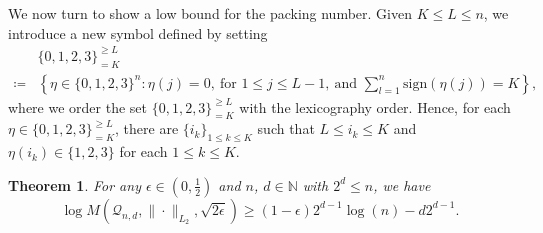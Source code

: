 \documentclass{amsbook}
\newtheorem{theorem}{Theorem}[chapter]
\theoremstyle{definition}
\theoremstyle{remark}
\numberwithin{section}{chapter}
\numberwithin{equation}{chapter}
\newcommand{\1}{\mathbf{1}}
\begin{document}
We now turn to show a low bound for the packing number. Given $K\leq L\leq n$, we introduce a new symbol defined by setting
\begin{align*}
&\{0,1,2,3\}^{\geq L}_{=K}\\
\coloneqq&\left\{\eta\in \{0,1,2,3\}^{n}:\eta(j)=0,~\mbox{for }1\leq j\leq L-1,~\mbox{and }\sum_{l=1}^{n}\mathrm{sign}(\eta(j))=K\right\},
\end{align*}
where we order the set $\{0,1,2,3\}^{\geq L}_{=K}$ with the lexicography order.
Hence, for each $\eta\in \{0,1,2,3\}^{\geq L}_{=K}$, there are $\{i_k\}_{1\leq k\leq K}$ such that $L\leq i_k\leq K$ and $\eta(i_k)\in \{1,2,3\}$ for each $1\leq k\leq K$. 


\begin{theorem}\label{low bdd}
For any $\epsilon\in (0,\frac{1}{2})$ and $n$, $d\in \mathbb{N}$ with $2^{d}\leq n$, we have
\[
\log M(\mathcal{Q}_{n,d},\|\cdot\|_{L_{2}},\sqrt{2\epsilon})\geq (1-\epsilon)2^{d-1}\log(n)-d2^{d-1}.
\]
\end{theorem}
\end{document}
